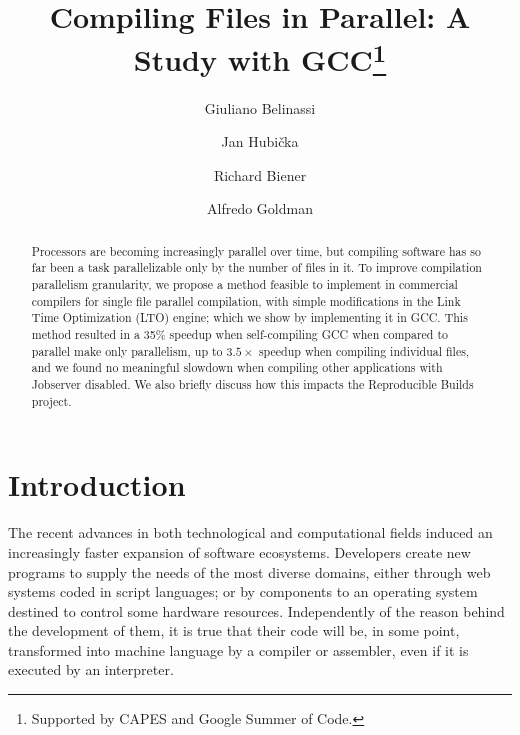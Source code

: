 \documentclass[runningheads]{llncs}
\begin{document}


%
\title{Compiling Files in Parallel: A Study with GCC\thanks{Supported by CAPES and Google Summer of Code.}}
%
%
\author{Giuliano Belinassi \and Jan Hubi\v cka  \and Richard Biener \and Alfredo Goldman}
%
%

%
\maketitle              %
%
\begin{abstract}

Processors are becoming increasingly parallel over time, but compiling software
has so far been a task parallelizable only by the number of files in it. To
improve compilation parallelism granularity, we propose a method feasible to
implement in commercial compilers for single file parallel compilation, with
simple modifications in the Link Time Optimization (LTO) engine; which we show
by implementing it in GCC. This method resulted in a 35\% speedup when
self-compiling GCC when compared to parallel make only parallelism, up to $3.5\times$
speedup when compiling individual files, and we found no meaningful slowdown
when compiling other applications with Jobserver disabled. We also briefly
discuss how this impacts the Reproducible Builds project.

\end{abstract}
%
%
%
\section{Introduction}

The recent advances in both technological and computational fields induced an
increasingly faster expansion of software ecosystems. Developers create new
programs to supply the needs of the most diverse domains, either through web
systems coded in script languages; or by components to an operating system
destined to control some hardware resources. Independently of the reason behind
the development of them, it is true that their code will be, in some
point, transformed into machine language by a compiler or assembler, even if it
is executed by an interpreter.
\end{document}
